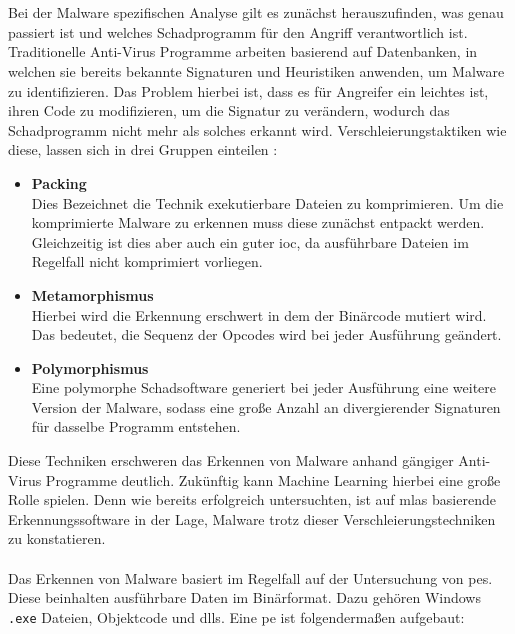 \documentclass[
    12pt, %
    DIV10,
    ngerman, %
    a4paper, %
    oneside, %
    titlepage, %
    parskip=half, %
    headings=normal, %
    listof=totoc, %
    bibliography=totoc, %
    index=totoc, %
    captions=tableheading, %
    final %
]{scrreprt}
\begin{document}
\\\\
Bei der Malware spezifischen Analyse gilt es zunächst herauszufinden, was genau passiert ist und welches Schadprogramm für den Angriff verantwortlich ist. Traditionelle Anti-Virus Programme arbeiten basierend auf Datenbanken, in welchen sie bereits bekannte Signaturen und Heuristiken anwenden, um Malware zu identifizieren. Das Problem hierbei ist, dass es für Angreifer ein leichtes ist, ihren Code zu modifizieren, um die Signatur zu verändern, wodurch das Schadprogramm nicht mehr als solches erkannt wird. Verschleierungstaktiken wie diese, lassen sich in drei Gruppen einteilen \parencite{he2017model}:
\begin{itemize}
\item \textbf{Packing}\\ Dies Bezeichnet die Technik exekutierbare Dateien zu komprimieren. Um die komprimierte Malware zu erkennen muss diese zunächst entpackt werden. Gleichzeitig ist dies aber auch ein guter \ac{ioc}, da ausführbare Dateien im Regelfall nicht komprimiert vorliegen.
\item \textbf{Metamorphismus}\\ Hierbei wird die Erkennung erschwert in dem der Binärcode mutiert wird. Das bedeutet, die Sequenz der Opcodes wird bei jeder Ausführung geändert.
\item \textbf{Polymorphismus}\\ Eine polymorphe Schadsoftware generiert bei jeder Ausführung eine weitere Version der Malware, sodass eine große Anzahl an divergierender Signaturen für dasselbe Programm entstehen.
\end{itemize}
Diese Techniken erschweren das Erkennen von Malware anhand gängiger Anti-Virus Programme deutlich. Zukünftig kann Machine Learning hierbei eine große Rolle spielen. Denn wie \textcite{Han2019} bereits erfolgreich untersuchten, ist auf \ac{mlas} basierende Erkennungssoftware in der Lage, Malware trotz dieser Verschleierungstechniken zu konstatieren.
\\\\
Das Erkennen von Malware basiert im Regelfall auf der Untersuchung von \ac{pes}. Diese beinhalten ausführbare Daten im Binärformat. Dazu gehören Windows \texttt{.exe} Dateien, Objektcode und \ac{dlls}. Eine \acs{pe} ist folgendermaßen aufgebaut:
\end{document}
